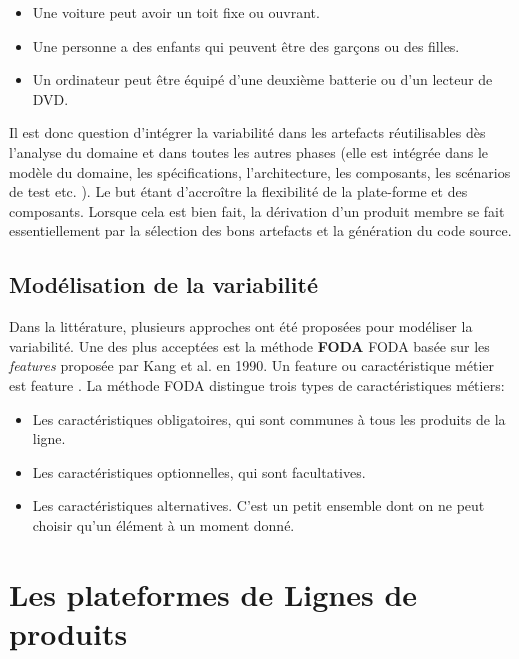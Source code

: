 \begin{itemize}
	\item  Une voiture peut avoir un toit fixe ou ouvrant.
	\item Une personne a des enfants qui peuvent être des garçons ou des filles.
	\item Un ordinateur peut être équipé d’une deuxième batterie ou d’un lecteur de DVD.
\end{itemize}
Il est donc question d'intégrer la variabilité dans les artefacts réutilisables dès l'analyse du domaine et dans toutes les autres phases (elle est intégrée dans le modèle du domaine, les spécifications, l'architecture, les composants, les scénarios de test etc. \cite{Magnus2003}). Le but étant d’accroître la flexibilité de la plate-forme et des composants. Lorsque cela est bien fait, la dérivation d'un produit membre se fait essentiellement par la sélection des bons artefacts et la génération du code source.
\subsection{Modélisation de la variabilité}
Dans la littérature, plusieurs approches ont été proposées pour modéliser la variabilité. Une des plus acceptées est la méthode \textbf{FODA} \glsdesc{FODA} basée sur les \textsl{features} proposée par Kang et al. en 1990. Un feature ou caractéristique métier est \glsdesc{feature} \cite{Kyo1990}. La méthode FODA distingue trois types de caractéristiques métiers:

\begin{itemize}
	\item  Les caractéristiques obligatoires, qui sont communes à tous les produits de la ligne.
	\item Les caractéristiques optionnelles, qui sont facultatives.
	\item Les caractéristiques alternatives. C'est un petit ensemble dont on ne peut choisir qu'un élément à un moment donné.
\end{itemize}

\section{Les plateformes de Lignes de produits}

